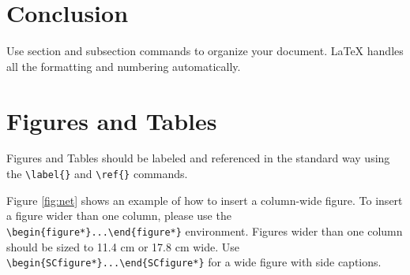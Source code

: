 \documentclass[9pt,twocolumn,twoside]{ilcss}
\begin{document}
\section{Conclusion}







Use section and subsection commands to organize your document. \LaTeX{} handles all the formatting and numbering automatically. 

\section{Figures and Tables}

Figures and Tables should be labeled and referenced in the standard way using the \verb|\label{}| and \verb|\ref{}| commands.




Figure \ref{fig:net} shows an example of how to insert a column-wide figure. To insert a figure wider than one column, please use the \verb|\begin{figure*}...\end{figure*}| environment. Figures wider than one column should be sized to 11.4 cm or 17.8 cm wide. Use \verb|\begin{SCfigure*}...\end{SCfigure*}| for a wide figure with side captions.
\end{document}
